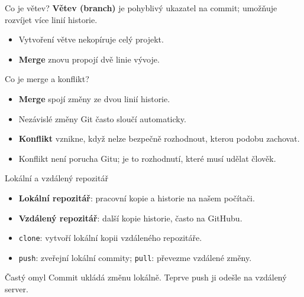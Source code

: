 \documentclass[aspectratio=169]{beamer}
\newcommand{\term}[1]{\textcolor{CodeBlue}{\textbf{#1}}}
\begin{document}
\begin{frame}{Co je větev?}
  \vspace{0.35cm}
  \term{Větev (branch)} je pohyblivý ukazatel na commit; umožňuje rozvíjet více linií historie.\par
  \centering
  \begin{itemize}
    \item Vytvoření větve nekopíruje celý projekt.
    \item \term{Merge} znovu propojí dvě linie vývoje.
  \end{itemize}
\end{frame}

\begin{frame}{Co je merge a konflikt?}
  \begin{itemize}
    \item \term{Merge} spojí změny ze dvou linií historie.
    \item Nezávislé změny Git často sloučí automaticky.
    \item \term{Konflikt} vznikne, když nelze bezpečně rozhodnout, kterou podobu zachovat.
    \item Konflikt není porucha Gitu; je to rozhodnutí, které musí udělat člověk.
  \end{itemize}
\end{frame}

\begin{frame}{Lokální a vzdálený repozitář}
  \begin{itemize}
    \item \term{Lokální repozitář}: pracovní kopie a historie na našem počítači.
    \item \term{Vzdálený repozitář}: další kopie historie, často na GitHubu.
    \item \texttt{clone}: vytvoří lokální kopii vzdáleného repozitáře.
    \item \texttt{push}: zveřejní lokální commity; \texttt{pull}: převezme vzdálené změny.
  \end{itemize}
  \begin{alertblock}{Častý omyl}
    Commit ukládá změnu lokálně. Teprve push ji odešle na vzdálený server.
  \end{alertblock}
\end{frame}
\end{document}
